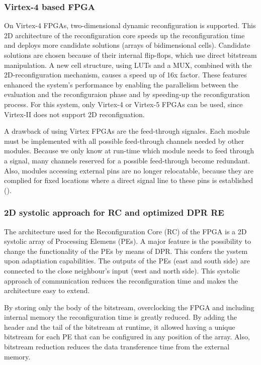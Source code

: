 
\subsubsection{Virtex-4 based FPGA}
On Virtex-4 FPGAs, two-dimensional dynamic reconfiguration is supported. This 2D architecture of the reconfiguration core speeds up the reconfiguration time and deploys more candidate solutions (arrays of bidimensional cells). Candidate solutions are chosen because of their internal flip-flops, which use direct bitstream manipulation. A new cell structure, using LUTs and a MUX, combined with the 2D-reconfiguration mechanism, causes a speed up of 16x factor. These features enhanced the system's performance by enabling the parallelism between the evaluation and the reconfiguraion phase and by speeding-up the reconfiguration process. For this system, only Virtex-4 or Virtex-5 FPGAs can be used, since Virtex-II does not support 2D reconfiguation.

A drawback of using Virtex FPGAs are the feed-through signales. Each module must be implemented with all possible feed-through channels  needed by other modules. Because we only know at run-time which module needs to feed through a signal, many channels reserved for a possible feed-through become redundant. Also, modules accessing external pins are no longer relocatable, because they are complied for fixed locations where a direct signal line to these pins is established (\cite{erlangen}).


\subsubsection{2D systolic approach for RC and optimized DPR RE}
The architecture used for the Reconfiguration Core (RC) of the FPGA is a 2D systolic array of Processing Elemens (PEs). A major feature is the possibility to change the functionality of the PEs by means of DPR. This confers the ysstem upon adaptiation capabilities. The outputs of the PEs (east and south side) are connected to the close neighbour's input (west and north side). This systolic approach of communication reduces the reconfiguration time and makes the architecture easy to extend.

By storing only the body of the bitstream, overclocking the FPGA and including internal memory the reconfiguration time is greatly reduced. By adding the header and the tail of the bitstream at runtime, it allowed having a unique bitstream for each PE that can be configured in any position of the array. Also, bitstream reduction reduces the data transference time from the external memory.

